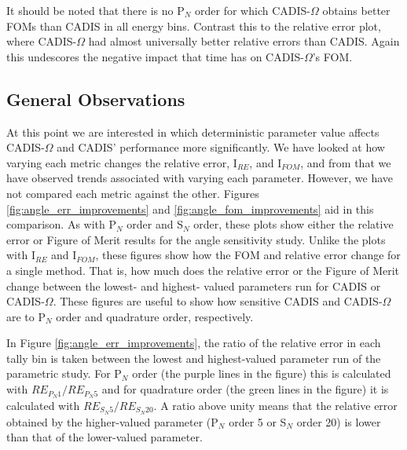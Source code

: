 It should be
noted that there is no P$_N$ order for which CADIS-$\Omega$ obtains better FOMs
than CADIS in all energy bins. Contrast this to the relative error plot, where
CADIS-$\Omega$ had almost universally better relative errors than CADIS. Again
this undescores the negative impact that time has on CADIS-$\Omega$'s FOM.

%
%
%
%
%
%
%

\subsection{General Observations}
\label{subsec:observations}

At this point we are interested in which deterministic parameter value affects
CADIS-$\Omega$ and CADIS' performance more significantly. We
have looked at how varying each metric changes the relative error, I$_{RE}$, and
I$_{FOM}$, and from that we have observed trends associated with varying each
parameter. However, we have not compared each metric against the other.
Figures \ref{fig:angle_err_improvements} and \ref{fig:angle_fom_improvements}
aid in this comparison. As with P$_N$ order and S$_N$
order, these plots show either the relative error or Figure of Merit results for
the angle sensitivity study. Unlike the plots with I$_{RE}$ and I$_{FOM}$, these
figures show how the FOM and relative error change for a single method. That is,
how much does the relative error or the Figure of Merit change between the lowest-
and highest- valued parameters run for CADIS or CADIS-$\Omega$.
These figures are useful to show how
sensitive CADIS and CADIS-$\Omega$ are to P$_N$ order and quadrature order,
respectively.

In Figure
\ref{fig:angle_err_improvements}, the ratio of the relative error in each tally
bin is taken between the lowest and highest-valued parameter run of the
parametric study. For P$_N$ order (the purple lines in the figure)
this is calculated with $RE_{P_N 1}/RE_{P_N 5}$ and for
quadrature order (the green lines in the figure) it is calculated with
$RE_{S_N 5}/RE_{S_N 20}$.
A ratio above unity means that the relative error obtained by
the higher-valued parameter (P$_N$ order 5 or S$_N$ order 20) is lower than that
of the lower-valued parameter.

